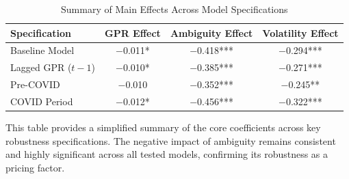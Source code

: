 \documentclass[preprint,12pt,authoryear]{elsarticle}
\begin{document}
\begin{table}[htbp]
\centering
\caption{Summary of Main Effects Across Model Specifications}
\label{tab:summary_effects}
\begin{threeparttable}
\begin{tabular*}{\textwidth}{@{\extracolsep{\fill}} lccc @{\extracolsep{\fill}}}
\toprule
Specification & GPR Effect & Ambiguity Effect & Volatility Effect \\
\midrule
Baseline Model & $-$0.011* & $-$0.418*** & $-$0.294*** \\
Lagged GPR ($t-1$) & $-$0.010* & $-$0.385*** & $-$0.271*** \\
Pre-COVID & $-$0.010 & $-$0.352*** & $-$0.245** \\
COVID Period & $-$0.012* & $-$0.456*** & $-$0.322*** \\
\bottomrule
\end{tabular*}
\begin{tablenotes}[flushleft]
\small
\item[] This table provides a simplified summary of the core coefficients across key robustness specifications. The negative impact of ambiguity remains consistent and highly significant across all tested models, confirming its robustness as a pricing factor.
\end{tablenotes}
\end{threeparttable}
\end{table}
\end{document}
